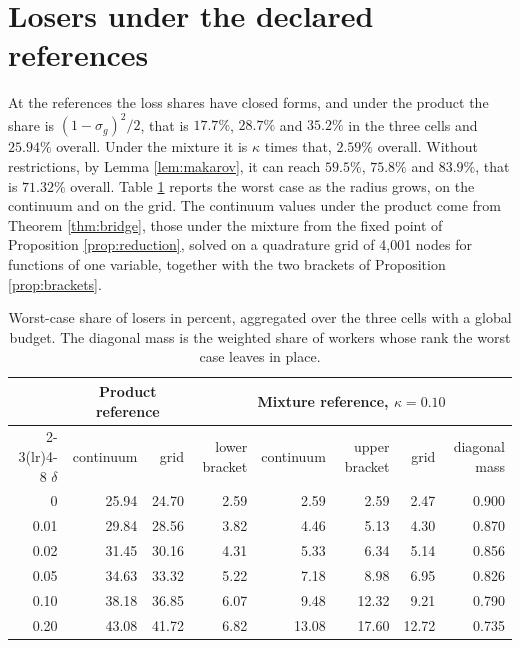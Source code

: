\documentclass[11pt,a4paper]{article}
\theoremstyle{notesplain}
\theoremstyle{notesupright}
\numberwithin{equation}{section}
\begin{document}
\section{Losers under the declared references}
\label{sec:losers}
At the references the loss shares have closed forms, and under the product the share is $(1-\sigma_g)^2/2$, that is $17.7\%$, $28.7\%$ and $35.2\%$ in the three cells and $25.94\%$ overall. Under the mixture it is $\kappa$ times that, $2.59\%$ overall. Without restrictions, by Lemma \ref{lem:makarov}, it can reach $59.5\%$, $75.8\%$ and $83.9\%$, that is $71.32\%$ overall. Table \ref{tab:curves} reports the worst case as the radius grows, on the continuum and on the grid. The continuum values under the product come from Theorem \ref{thm:bridge}, those under the mixture from the fixed point of Proposition \ref{prop:reduction}, solved on a quadrature grid of 4,001 nodes for functions of one variable, together with the two brackets of Proposition \ref{prop:brackets}.

\begin{table}[h]
\centering\small
\begin{tabular}{rrrrrrrr}
\toprule
& \multicolumn{2}{c}{Product reference} & \multicolumn{5}{c}{Mixture reference, $\kappa=0.10$}\\
\cmidrule(lr){2-3}\cmidrule(lr){4-8}
$\delta$ & continuum & grid & lower bracket & continuum & upper bracket & grid & diagonal mass\\
\midrule
0 & 25.94 & 24.70 & 2.59 & 2.59 & 2.59 & 2.47 & 0.900\\
0.01 & 29.84 & 28.56 & 3.82 & 4.46 & 5.13 & 4.30 & 0.870\\
0.02 & 31.45 & 30.16 & 4.31 & 5.33 & 6.34 & 5.14 & 0.856\\
0.05 & 34.63 & 33.32 & 5.22 & 7.18 & 8.98 & 6.95 & 0.826\\
0.10 & 38.18 & 36.85 & 6.07 & 9.48 & 12.32 & 9.21 & 0.790\\
0.20 & 43.08 & 41.72 & 6.82 & 13.08 & 17.60 & 12.72 & 0.735\\
\bottomrule
\end{tabular}
\caption{Worst-case share of losers in percent, aggregated over the three cells with a global budget. The diagonal mass is the weighted share of workers whose rank the worst case leaves in place.}
\label{tab:curves}
\end{table}
\end{document}
